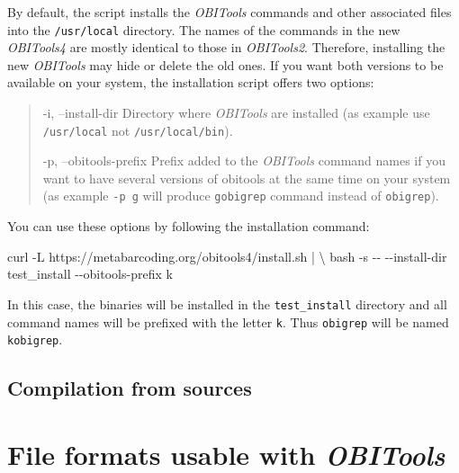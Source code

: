 \documentclass[
  letterpaper,
  DIV=11,
  numbers=noendperiod]{scrreprt}
\newenvironment{Shaded}{\begin{snugshade}}{\end{snugshade}}
\newcommand{\AttributeTok}[1]{\textcolor[rgb]{0.40,0.45,0.13}{#1}}
\newcommand{\DataTypeTok}[1]{\textcolor[rgb]{0.68,0.00,0.00}{#1}}
\newcommand{\ExtensionTok}[1]{\textcolor[rgb]{0.00,0.23,0.31}{#1}}
\newcommand{\FunctionTok}[1]{\textcolor[rgb]{0.28,0.35,0.67}{#1}}
\newcommand{\KeywordTok}[1]{\textcolor[rgb]{0.00,0.23,0.31}{#1}}
\newcommand{\NormalTok}[1]{\textcolor[rgb]{0.00,0.23,0.31}{#1}}
\begin{document}
By default, the script installs the \emph{OBITools} commands and other
associated files into the \texttt{/usr/local} directory. The names of
the commands in the new \emph{OBITools4} are mostly identical to those
in \emph{OBITools2}. Therefore, installing the new \emph{OBITools} may
hide or delete the old ones. If you want both versions to be available
on your system, the installation script offers two options:

\begin{quote}
-i, --install-dir Directory where \emph{OBITools} are installed (as
example use \texttt{/usr/local} not \texttt{/usr/local/bin}).

-p, --obitools-prefix Prefix added to the \emph{OBITools} command names
if you want to have several versions of obitools at the same time on
your system (as example \texttt{-p\ g} will produce \texttt{gobigrep}
command instead of \texttt{obigrep}).
\end{quote}

You can use these options by following the installation command:

\begin{Shaded}
\begin{Highlighting}[]
\ExtensionTok{curl} \AttributeTok{{-}L}\NormalTok{ https://metabarcoding.org/obitools4/install.sh }\KeywordTok{|} \DataTypeTok{\textbackslash{}}
      \FunctionTok{bash} \AttributeTok{{-}s} \AttributeTok{{-}{-}} \AttributeTok{{-}{-}install{-}dir}\NormalTok{ test\_install }\AttributeTok{{-}{-}obitools{-}prefix}\NormalTok{ k}
\end{Highlighting}
\end{Shaded}

In this case, the binaries will be installed in the
\texttt{test\_install} directory and all command names will be prefixed
with the letter \texttt{k}. Thus \texttt{obigrep} will be named
\texttt{kobigrep}.

\hypertarget{compilation-from-sources}{%
\section{Compilation from sources}\label{compilation-from-sources}}

\hypertarget{file-formats-usable-with-obitools}{%
\chapter{\texorpdfstring{File formats usable with
\emph{OBITools}}{File formats usable with OBITools}}\label{file-formats-usable-with-obitools}}
\end{document}
